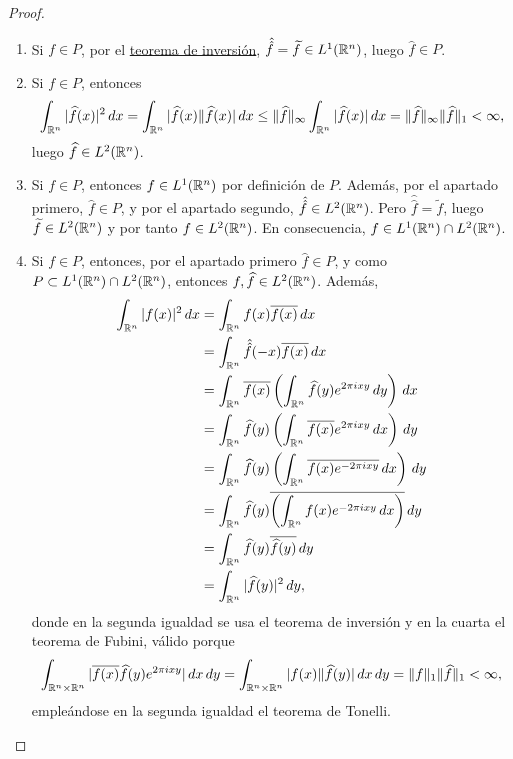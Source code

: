 \documentclass[a4paper, 11pt, oneside]{report}
\begin{document}
\begin{proof}
  \hfill
  \begin{enumerate}
    \item Si $f \in P$, por el \hyperref[teo:3.2.3]{\color{c1}teorema de inversión}, $\hat{\hat{f}} = \widetilde{f} \in L^1(\mathbb R^n)$, luego $\widehat{f} \in P$.
    \item Si $f \in P$, entonces
    \[\int_{\mathbb R^n} |\widehat{f}(x)|^2 \, dx = \int_{\mathbb R^n} |\widehat{f}(x)\|\widehat{f}(x)| \, dx \leq \|\widehat{f}\|_\infty\int_{\mathbb R^n} |\widehat{f}(x)| \, dx = \|\widehat{f}\|_\infty \|\widehat{f}\|_1 < \infty,\]
    luego $\widehat{f} \in L^2(\mathbb R^n)$.
    \item Si $f \in P$, entonces $f \in L^1(\mathbb R^n)$ por definición de $P$. Además, por el apartado primero, $\widehat{f} \in P$, y por el apartado segundo, $\hat{\hat{f}} \in L^2(\mathbb R^n)$. Pero $\hat{\hat{f}} = \widetilde{f}$, luego $\widetilde{f} \in L^2(\mathbb R^n)$ y por tanto $f \in L^2(\mathbb R^n)$. En consecuencia, $f \in L^1(\mathbb R^n) \cap L^2(\mathbb R^n)$.
    \item Si $f \in P$, entonces, por el apartado primero $\widehat{f} \in P$, y como $P \subset L^1(\mathbb R^n) \cap L^2(\mathbb R^n)$, entonces $f,\widehat{f} \in L^2(\mathbb R^n)$. Además,
    \[\begin{aligned}[t]
      \int_{\mathbb R^n} |f(x)|^2 \, dx &= \int_{\mathbb R^n} f(x)\overline{f(x)} \, dx \\
      &= \int_{\mathbb R^n} \hat{\hat{f}}(-x)\overline{f(x)} \, dx \\
      &= \int_{\mathbb R^n} \overline{f(x)} \left(\int_{\mathbb R^n} \widehat{f}(y)e^{2\pi i xy} \, dy\right) \, dx \\
      &= \int_{\mathbb R^n} \widehat{f}(y) \left(\int_{\mathbb R^n} \overline{f(x)}e^{2\pi i xy} \, dx\right) \, dy \\
      &= \int_{\mathbb R^n} \widehat{f}(y) \left(\int_{\mathbb R^n} \overline{f(x)e^{-2\pi i xy}} \, dx\right) \, dy \\
      &= \int_{\mathbb R^n} \widehat{f}(y) \overline{\left(\int_{\mathbb R^n} f(x)e^{-2\pi i xy} \, dx\right)} \, dy \\
      &= \int_{\mathbb R^n} \widehat{f}(y) \overline{\widehat{f}(y)} \, dy \\
      &= \int_{\mathbb R^n} |\widehat{f}(y)|^2 \, dy,
    \end{aligned}\]
    donde en la segunda igualdad se usa el teorema de inversión y en la cuarta el teorema de Fubini, válido porque
    \[\int_{\mathbb R^n \times \mathbb R^n}|\overline{f(x)}\widehat{f}(y)e^{2\pi i xy}| \, dx \, dy = \int_{\mathbb R^n \times \mathbb R^n} |f(x)\|\widehat{f}(y)| \, dx \, dy = \|f\|_1  \|\widehat{f}\|_{1} < \infty,\]
    empleándose en la segunda igualdad el teorema de Tonelli. \qedhere
  \end{enumerate}
\end{proof}
\end{document}
